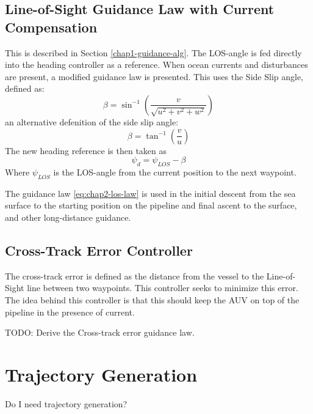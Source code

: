 	
	
	\subsection{Line-of-Sight Guidance Law with Current Compensation}
		This is described in Section \ref{chap1-guidance-alg}. The LOS-angle is fed directly into the heading controller as a reference. When ocean currents and disturbances are present, a modified guidance law is presented. This uses the Side Slip angle, defined as:
		\begin{equation}
			\label{eq:chap2-sideslip}
			\beta = \sin^{-1} ( \frac{v}{\sqrt{u^2 + v^2 + w^2}})
		\end{equation}
		an alternative defenition of the side slip angle:
		\begin{equation*}
			\beta = \tan^{-1} (\frac{v}{u})
		\end{equation*}
		The new heading reference is then taken as
		\begin{equation}
			\label{eq:chap2-los-law}
			\psi_d = \psi_{LOS} - \beta
		\end{equation}
		Where $\psi_{LOS}$ is the LOS-angle from the current position to the next waypoint.
		
		The guidance law \eqref{eq:chap2-los-law} is used in the initial descent from the sea surface to the starting position on the pipeline and final ascent to the surface, and other long-distance guidance.
		
	\subsection{Cross-Track Error Controller}
		The cross-track error is defined as the distance from the vessel to the Line-of-Sight line between two waypoints. This controller seeks to minimize this error. The idea behind this controller is that this should keep the AUV on top of the pipeline in the presence of current.
		
		TODO: Derive the Cross-track error guidance law. \cite{cross-track}
		
		
		
	
\section{Trajectory Generation}
	Do I need trajectory generation? 	
	
